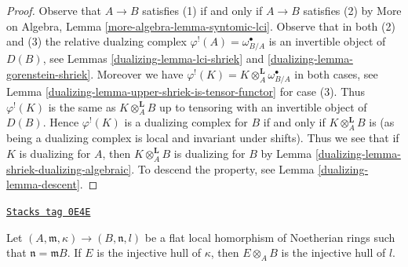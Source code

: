 \begin{proof}

Observe that $A \to B$ satisfies (1) if and only if $A \to B$
satisfies (2) by  More on Algebra, Lemma \ref{more-algebra-lemma-syntomic-lci}.
Observe that in both (2) and (3) the relative dualzing
complex $\varphi^!(A) = \omega_{B/A}^\bullet$ is an invertible
object of $D(B)$, see
Lemmas \ref{dualizing-lemma-lci-shriek} and \ref{dualizing-lemma-gorenstein-shriek}.
Moreover we have
$\varphi^!(K) = K \otimes_A^\mathbf{L} \omega_{B/A}^\bullet$
in both cases, see Lemma \ref{dualizing-lemma-upper-shriek-is-tensor-functor}
for case (3).
Thus $\varphi^!(K)$ is the same as $K \otimes_A^\mathbf{L} B$
up to tensoring with an invertible object of $D(B)$.
Hence $\varphi^!(K)$ is a dualizing complex for $B$
if and only if $K \otimes_A^\mathbf{L} B$ is
(as being a dualizing complex is local and invariant under shifts).
Thus we see that if $K$ is dualizing for $A$, then
$K \otimes_A^\mathbf{L} B$ is dualizing for $B$ by
Lemma \ref{dualizing-lemma-shriek-dualizing-algebraic}.
To descend the property, see
Lemma \ref{dualizing-lemma-descent}.
\end{proof}

\begin{lemma}
\label{dualizing-lemma-injective-hull-goes-up}
\href{https://stacks.math.columbia.edu/tag/0E4E}{\texttt{Stacks tag 0E4E}}

Let $(A, \mathfrak m, \kappa) \to (B, \mathfrak n, l)$
be a flat local homorphism of Noetherian rings such that
$\mathfrak n = \mathfrak m B$. If $E$ is the injective
hull of $\kappa$, then $E \otimes_A B$ is the injective
hull of $l$.
\end{lemma}

